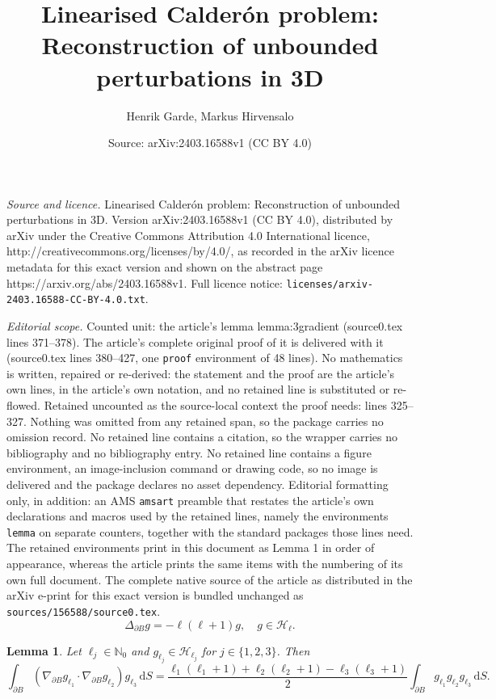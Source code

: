 \documentclass[10pt,a4paper]{amsart}
\title{Linearised Calder\'on problem: Reconstruction of unbounded perturbations in 3D}
\author{Henrik Garde, Markus Hirvensalo}
\date{Source: arXiv:2403.16588v1 (CC BY 4.0)}
\newtheorem{lemma}{Lemma}
\newcommand{\N}{\mathbb{N}}
\newcommand{\di}{\mathrm{d}}   %
\begin{document}
\maketitle

\noindent\emph{Source and licence.} Linearised Calder\'on problem: Reconstruction of unbounded perturbations in 3D. Version arXiv:2403.16588v1 (CC BY 4.0), distributed by arXiv under the Creative Commons Attribution 4.0 International licence, http://creativecommons.org/licenses/by/4.0/, as recorded in the arXiv licence metadata for this exact version and shown on the abstract page https://arxiv.org/abs/2403.16588v1. Full licence notice: \texttt{licenses/arxiv-2403.16588-CC-BY-4.0.txt}.\par\smallskip

\noindent\textit{Editorial scope.} Counted unit: the article's lemma lemma:3gradient (source0.tex lines 371--378). The article's complete original proof of it is delivered with it (source0.tex lines 380--427, one \texttt{proof} environment of 48 lines). No mathematics is written, repaired or re-derived: the statement and the proof are the article's own lines, in the article's own notation, and no retained line is substituted or re-flowed.  Retained uncounted as the source-local context the proof needs: lines 325--327.  Nothing was omitted from any retained span, so the package carries no omission record.  No retained line contains a citation, so the wrapper carries no bibliography and no bibliography entry.  No retained line contains a figure environment, an image-inclusion command or drawing code, so no image is delivered and the package declares no asset dependency.  Editorial formatting only, in addition: an AMS \texttt{amsart} preamble that restates the article's own declarations and macros used by the retained lines, namely the environments \texttt{lemma} on separate counters, together with the standard packages those lines need.  The retained environments print in this document as Lemma 1 in order of appearance, whereas the article prints the same items with the numbering of its own full document.  The complete native source of the article as distributed in the arXiv e-print for this exact version is bundled unchanged as \texttt{sources/156588/source0.tex}.
\begin{equation} \label{eq:LBeig}
    \Delta_{\partial B}g = -\ell(\ell+1)g, \quad g\in\mathcal{H}_\ell.
\end{equation}

\begin{lemma} \label{lemma:3gradient}
    Let $\ell_j\in \N_0$ and $g_{\ell_j} \in \mathcal{H}_{\ell_j}$ for $j\in\{1,2,3\}$. Then
    \begin{equation*}
        \int_{\partial B} (\nabla_{\partial B} g_{\ell_1} \cdot \nabla_{\partial B} g_{\ell_2}) g_{\ell_3} \, \di S = \frac{\ell_1 (\ell_1 + 1) + \ell_2 (\ell_2 + 1) - \ell_3 (\ell_3 + 1)}{2} \int_{\partial B} g_{\ell_1} g_{\ell_2} g_{\ell_3} \, \di S.
    \end{equation*}
\end{lemma}
\end{document}
